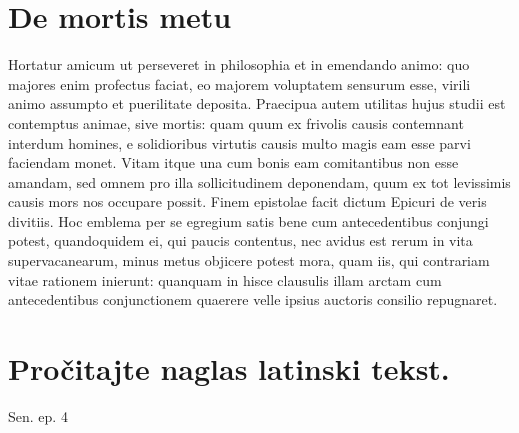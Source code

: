 


\section*{De mortis metu}

Hortatur amicum ut perseveret in philosophia et in emendando animo: quo majores enim profectus faciat, eo majorem voluptatem sensurum esse, virili animo assumpto et puerilitate deposita. Praecipua autem utilitas hujus studii est contemptus animae, sive mortis: quam quum ex frivolis causis contemnant interdum homines, e solidioribus virtutis causis multo magis eam esse parvi faciendam monet. Vitam itque una cum bonis eam comitantibus non esse amandam, sed omnem pro illa sollicitudinem deponendam, quum ex tot levissimis causis mors nos occupare possit. Finem epistolae facit dictum Epicuri de veris divitiis. Hoc emblema per se egregium satis bene cum antecedentibus conjungi potest, quandoquidem ei, qui paucis contentus, nec avidus est rerum in vita supervacanearum, minus metus objicere potest mora, quam iis, qui contrariam vitae rationem inierunt: quanquam in hisce clausulis illam arctam cum antecedentibus conjunctionem quaerere velle ipsius auctoris consilio repugnaret.

\newpage

\section*{Pročitajte naglas latinski tekst.}


Sen. ep. 4

\medskip

